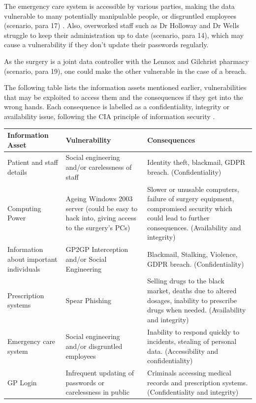 \documentclass[12pt,a4paper]{article}
\begin{document}
The emergency care system is accessible by various parties, making the data vulnerable to many potentially manipulable people, or disgruntled employees (scenario, para 17) \cite{patientConfidentiality}. Also, overworked staff such as Dr Holloway and Dr Wells struggle to keep their administration up to date (scenario, para 14), which may cause a vulnerability if they don't update their passwords regularly. 

As the surgery is a joint data controller with the Lennox and Gilchrist pharmacy (scenario, para 19), one could make the other vulnerable in the case of a breach.

The following table lists the information assets mentioned earlier, vulnerabilities that may be exploited to access them and the consequences if they get into the wrong hands. Each consequence is labelled as a confidentiality, integrity or availability issue, following the CIA principle of information security \cite{CIA}.

\begin{center}
\begin{longtable}{ |p{}|p{}|p{}| } 
 \hline
 \textbf{Information Asset} & \textbf{Vulnerability} & \textbf{Consequences} \\ 
  \hline
 Patient and staff details & Social engineering and/or carelessness of staff & Identity theft, blackmail, GDPR breach. (Confidentiality)\\ 
  \hline
 Computing Power & Ageing Windows 2003 server (could be easy to hack into, giving access to the surgery's PCs) & Slower or unusable computers, failure of surgery equipment, compromised security which could lead to further consequences. (Availability and integrity) \\ 
 \hline
 Information about important individuals & GP2GP Interception and/or Social Engineering & Blackmail, Stalking, Violence, GDPR breach. (Confidentiality) \\ 
 \hline
 Prescription systems & Spear Phishing & Selling drugs to the black market, deaths due to altered dosages, inability to prescribe drugs when needed. (Availability and integrity) \\ 
 \hline
 Emergency care system & Social engineering and/or disgruntled employees & Inability to respond quickly to incidents, stealing of personal data. (Accessibility and confidentiality) \\
 \hline
 GP Login & Infrequent updating of passwords or carelessness in public & Criminals accessing medical records and prescription systems. (Confidentiality and integrity) \\ 
 \hline
\end{longtable}
\caption{\textit{Table 1: Information assets, vulnerabilities and consequences}}
\end{center}
\end{document}
